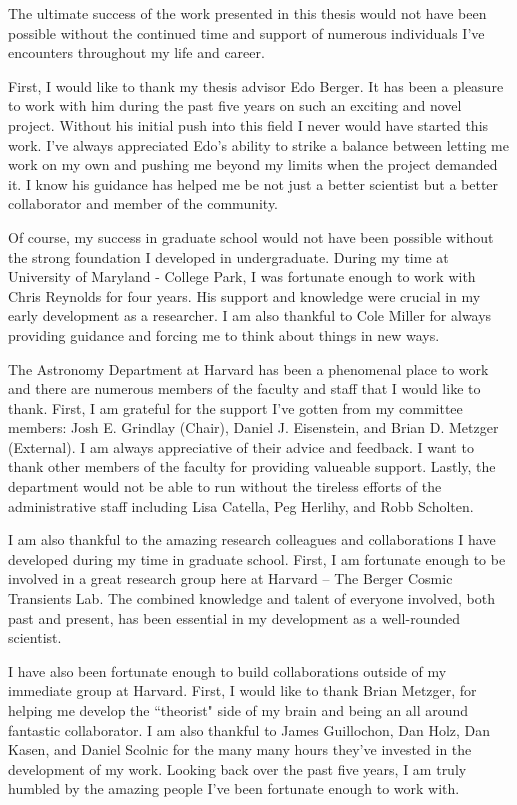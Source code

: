 The ultimate success of the work presented in this thesis would not have been possible without the continued time and support of numerous individuals I've encounters throughout my life and career.

First, I would like to thank my thesis advisor Edo Berger. It has been a pleasure to work with him during the past five years on such an exciting and novel project. Without his initial push into this field I never would have started this work. I've always appreciated Edo's ability to strike a balance between letting me work on my own and pushing me beyond my limits when the project demanded it. I know his guidance has helped me be not just a better scientist but a better collaborator and member of the community.

Of course, my success in graduate school would not have been possible without the strong foundation I developed in undergraduate. During my time at University of Maryland - College Park, I was fortunate enough to work with Chris Reynolds for four years. His support and knowledge were crucial in my early development as a researcher. I am also thankful to Cole Miller for always providing guidance and forcing me to think about things in new ways.

The Astronomy Department at Harvard has been a phenomenal place to work and there are numerous members of the faculty and staff that I would like to thank. First, I am grateful for the support I've gotten from my committee members: Josh E. Grindlay (Chair), Daniel J. Eisenstein, and Brian D. Metzger (External). I am always appreciative of their advice and feedback. I want to thank other members of the faculty for providing valueable support. Lastly, the department would not be able to run without the tireless efforts of the administrative staff including Lisa Catella, Peg Herlihy, and Robb Scholten.

I am also thankful to the amazing research colleagues and collaborations I have developed during my time in graduate school. First, I am fortunate enough to be involved in a great research group here at Harvard -- The Berger Cosmic Transients Lab. The combined knowledge and talent of everyone involved, both past and present, has been essential in my development as a well-rounded scientist.

I have also been fortunate enough to build collaborations outside of my immediate group at Harvard. First, I would like to thank Brian Metzger, for helping me develop the ``theorist" side of my brain and being an all around fantastic collaborator. I am also thankful to James Guillochon, Dan Holz, Dan Kasen, and Daniel Scolnic for the many many hours they've invested in the development of my work. Looking back over the past five years, I am truly humbled by the amazing people I've been fortunate enough to work with.

